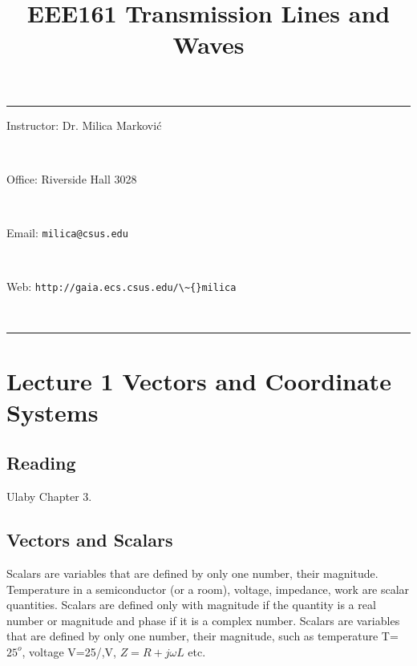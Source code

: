 %







\noindent



\title{EEE161 Transmission Lines and Waves}

\maketitle

\vspace{0.3cm}

\noindent
\rule[.5mm]{\textwidth}{.5mm}

\noindent
\centerline{Instructor: Dr. Milica Markovi{\'c}} \\
\centerline{Office: Riverside Hall 3028} \\
\centerline{Email: \verb!milica@csus.edu!} \\
\centerline{Web: \verb!http://gaia.ecs.csus.edu/\~{}milica!}\\


\noindent
\rule[.5mm]{\textwidth}{.5mm}


\vspace*{0.2cm}



\section{Lecture 1 Vectors and Coordinate Systems}


\subsection{Reading}
Ulaby Chapter 3. 

\subsection{Vectors and Scalars}
Scalars are variables that are defined by only one number, their magnitude. Temperature in a semiconductor (or a room), voltage, impedance, work are scalar quantities. Scalars are defined only with magnitude if the quantity is a real number or magnitude and phase if it is a complex number. Scalars are variables that are defined by only one number, their magnitude, such as temperature T=$25^o$, voltage V=25/,V, $Z=R+j \omega L$ etc.

